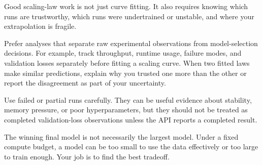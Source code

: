 \documentclass[
  11pt,
]{article}
\begin{document}
Good scaling-law work is not just curve fitting. It also requires
knowing which runs are trustworthy, which runs were undertrained or
unstable, and where your extrapolation is fragile.

Prefer analyses that separate raw experimental observations from
model-selection decisions. For example, track throughput, runtime usage,
failure modes, and validation losses separately before fitting a scaling
curve. When two fitted laws make similar predictions, explain why you
trusted one more than the other or report the disagreement as part of
your uncertainty.

Use failed or partial runs carefully. They can be useful evidence about
stability, memory pressure, or poor hyperparameters, but they should not
be treated as completed validation-loss observations unless the API
reports a completed result.

The winning final model is not necessarily the largest model. Under a
fixed compute budget, a model can be too small to use the data
effectively or too large to train enough. Your job is to find the best
tradeoff.
\end{document}
